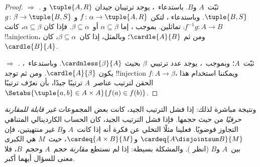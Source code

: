 \documentclass[../../../include/open-logic-section]{subfiles}
\begin{document}
\begin{proof}
\emph{ $\Rightarrow$ .} ثبّت~$A$
و$B$. باستدعاء~، يوجد ترتيبان جيدان
$\tuple{A, R}$ و$\tuple{B, S}$. وباستدعاء
، لتكن
$f \colon \alpha \to \tuple{A, R}$ و
$g \colon \beta \to \tuple{B, S}$ تماثلين. بموجب
، إما
$\alpha \subseteq \beta$ أو~$\beta \subseteq \alpha$. فإذا كان
$\alpha \subseteq \beta$، كانت
$\comp{f^{-1}}{g} \colon A \to B$ !!a{injection}، ومن ثم
$\cardle{A}{B}$؛ وبالمثل، إذا كان~$\beta \subseteq \alpha$، كان
$\cardle{B}{A}$.

\emph{ $\Rightarrow$ .} ثبّت~$A$؛
وبموجب~، يوجد عدد ترتيبي~$\beta$ بحيث
$\cardnless{\beta}{A}$. وباستدعاء~، يكون
$\cardle{A}{\beta}$. ومن ثم توجد !!{injection}
$f \colon A \to \beta$، ويمكننا استخدام هذا الحقن لترتيب عناصر~$A$
ترتيبًا جيدًا، بأن نعرّف ترتيبًا
$\Setabs{\tuple{a, b} \in A \times A}{f(a) \in f(b)}$.
\end{proof}
\noindent
ونتيجة مباشرة لذلك: إذا فشل الترتيب الجيد، كانت بعض المجموعات
\emph{غير قابلة للمقارنة حرفيًا} من حيث حجمها. فإذا فشل الترتيب الجيد،
كان الحساب الكاردينالي المتناهي التجاوز فوضويًا. فعلينا مثلًا التخلي
عن فكرة أنه إذا كانت~$A$ و$B$ غير منتهيتين، فإن
$\cardeq{A \disjointsum B}{M}$ و$\cardeq{A \times B}{M}$، حيث~$M$ هي
الكبرى بين~$A$ و$B$ (انظر
). والمشكلة بسيطة: إذا
لم نستطع \emph{مقارنة} حجم~$A$ وحجم~$B$، فلا معنى للسؤال أيهما أكبر.
\end{document}
